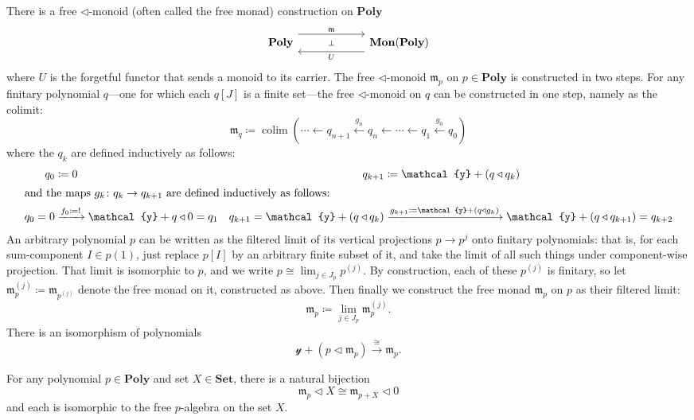\documentclass[11pt, one side, article]{memoir}
\theoremstyle{definition}
\theoremstyle{plain}
\DeclareMathOperator*{\colim}{colim}
\newcommand{\Cat}[1]{\mathbf{#1}}%
\newcommand{\To}[2][]{\xrightarrow[#1]{#2}}
\newcommand{\from}{\leftarrow}
\newcommand{\From}[1]{\xleftarrow{#1}}
\newcommand{\smset}{\Cat{Set}}
\newcommand{\yon}{\mathcal{y}}
\newcommand{\poly}{\Cat{Poly}}
\newcommand{\0}{\textsf{0}}
\newcommand{\1}{\tn{\textsf{1}}}
\newcommand{\tri}{\mathbin{\triangleleft}}
\begin{document}
There is a free $\tri$-monoid (often called the free monad) construction on $\poly$
\begin{equation}
\begin{tikzcd}[column sep=60pt]
	\poly
  	\ar[from=r, shift left=8pt, "U"]
		\ar[from=r, phantom, "\scriptstyle\bot"]
  	&
	\Cat{Mon}(\poly)
		\ar[from=l, shift right=-8pt, "\mathfrak{m}"]
\end{tikzcd}
\end{equation}
where $U$ is the forgetful functor that sends a monoid to its carrier. The free $\tri$-monoid $\mathfrak{m}_p$ on $p\in\poly$ is constructed in two steps. For any finitary polynomial $q$---one for which each $q[J]$ is a finite set---the free $\tri$-monoid on $q$ can be constructed in one step, namely as the colimit:
\begin{equation}
	\mathfrak{m}_q\coloneqq\colim(\cdots\from q_{n+1}\From{g_n}q_n\from\cdots\from q_1\From{g_0} q_0)
\end{equation}
where the $q_k$ are defined inductively as follows:
\begin{align}
	q_0&\coloneqq 0&q_{k+1}&\coloneqq \yon+(q\tri q_k)\\
\intertext{and the maps $g_k\colon q_{k}\to q_{k+1}$ are defined inductively as follows:}
	q_0=0&\To{f_0\coloneqq!}\yon+q\tri 0=q_1&q_{k+1}=\yon+(q\tri q_{k})&\To{g_{k+1}\coloneqq\yon+(q\tri g_k)}\yon+(q\tri q_{k+1})=q_{k+2}
\end{align}
An arbitrary polynomial $p$ can be written as the filtered limit of its vertical projections $p\to p^{j}$ onto finitary polynomials: that is, for each sum-component $I\in p(1)$, just replace $p[I]$ by an arbitrary finite subset of it, and take the limit of all such things under component-wise projection. That limit is isomorphic to $p$, and we write $p\cong\lim_{j\in J_p}p^{(j)}$. By construction, each of these $p^{(j)}$ is finitary, so let $\mathfrak{m}_p^{(j)}\coloneqq\mathfrak{m}_{p^{(j)}}$ denote the free monad on it, constructed as above. Then finally we construct the free monad $\mathfrak{m}_p$ on $p$ as their filtered limit:
\begin{equation}
	\mathfrak{m}_p\coloneqq\lim_{j\in J_p}\mathfrak{m}_p^{(j)}.
\end{equation}
There is an isomorphism of polynomials
\begin{equation}
	 \yon+(p\tri\mathfrak{m}_p)\To{\cong}\mathfrak{m}_p.
	\end{equation}


For any polynomial $p\in\poly$ and set $X\in\smset$, there is a natural bijection
\begin{equation}
  \mathfrak{m}_p\tri X
  \cong
	\mathfrak{m}_{p+X}\tri 0  
\end{equation}
and each is isomorphic to the free $p$-algebra on the set $X$.
\end{document}
